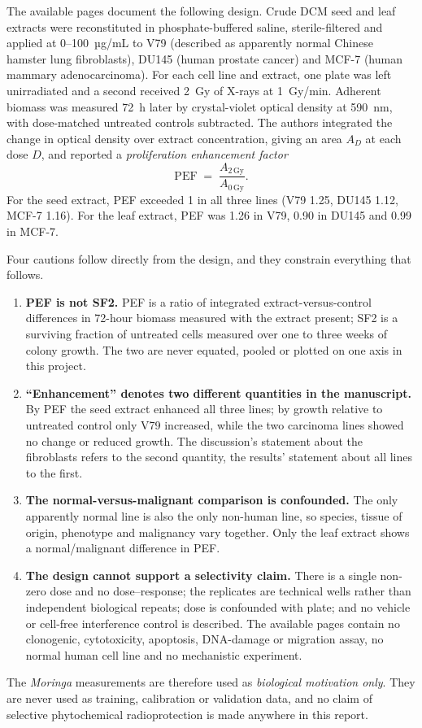 The available pages document the following design. Crude DCM seed and leaf extracts were
reconstituted in phosphate-buffered saline, sterile-filtered and applied at
0--100~µg/mL to V79 (described as apparently normal Chinese hamster lung fibroblasts),
DU145 (human prostate cancer) and MCF-7 (human mammary adenocarcinoma). For each cell line
and extract, one plate was left unirradiated and a second received 2~Gy of X-rays at
1~Gy/min. Adherent biomass was measured 72~h later by crystal-violet optical density at
590~nm, with dose-matched untreated controls subtracted. The authors integrated the change
in optical density over extract concentration, giving an area $A_D$ at each dose $D$, and
reported a \emph{proliferation enhancement factor}
\begin{equation}
  \mathrm{PEF} \;=\; \frac{A_{2\,\mathrm{Gy}}}{A_{0\,\mathrm{Gy}}} .
  \label{eq:pef}
\end{equation}
For the seed extract, PEF exceeded 1 in all three lines (V79 1.25, DU145 1.12, MCF-7 1.16).
For the leaf extract, PEF was 1.26 in V79, 0.90 in DU145 and 0.99 in MCF-7.

Four cautions follow directly from the design, and they constrain everything that follows.
\begin{enumerate}
  \item \textbf{PEF is not SF2.} PEF is a ratio of integrated extract-versus-control
    differences in 72-hour biomass measured with the extract present; SF2 is a surviving
    fraction of untreated cells measured over one to three weeks of colony growth. The two
    are never equated, pooled or plotted on one axis in this project.
  \item \textbf{\enquote{Enhancement} denotes two different quantities in the manuscript.}
    By PEF the seed extract enhanced all three lines; by growth relative to untreated
    control only V79 increased, while the two carcinoma lines showed no change or reduced
    growth. The discussion's statement about the fibroblasts refers to the second quantity,
    the results' statement about all lines to the first.
  \item \textbf{The normal-versus-malignant comparison is confounded.} The only apparently
    normal line is also the only non-human line, so species, tissue of origin, phenotype
    and malignancy vary together. Only the leaf extract shows a normal/malignant difference
    in PEF.
  \item \textbf{The design cannot support a selectivity claim.} There is a single non-zero
    dose and no dose--response; the replicates are technical wells rather than independent
    biological repeats; dose is confounded with plate; and no vehicle or cell-free
    interference control is described. The available pages contain no clonogenic,
    cytotoxicity, apoptosis, DNA-damage or migration assay, no normal human cell line and
    no mechanistic experiment.
\end{enumerate}
The \textit{Moringa} measurements are therefore used as \emph{biological motivation only}.
They are never used as training, calibration or validation data, and no claim of selective
phytochemical radioprotection is made anywhere in this report.

